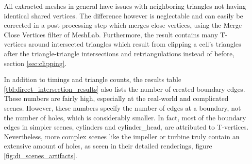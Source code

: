 All extracted meshes in general have issues with neighboring triangles not having identical shared vertices.
The difference however is neglectable and can easily be corrected in a post processing step which merges close vertices, \eg using the Merge Close Vertices filter of MeshLab.
Furthermore, the result contains many T-vertices around intersected triangles which result from clipping a cell's triangles after the triangle-triangle intersections and retriangulations instead of before, \cf section \ref{sec:clipping}.

In addition to timings and triangle counts, the results table \ref{tbl:direct_intersection_results} also lists the number of created boundary edges.
These numbers are fairly high, especially at the real-world and complicated scenes.
However, these numbers specify the number of edges at a boundary, not the number of holes, which is considerably smaller.
In fact, most of the boundary edges in simpler scenes, \eg cylinders and cylinder\_head, are attributed to T-vertices.
Nevertheless, more complex scenes like the impeller or turbine truly contain an extensive amount of holes, as sceen in their detailed renderings, \cf figure \ref{fig:di_scenes_artifacts}.
